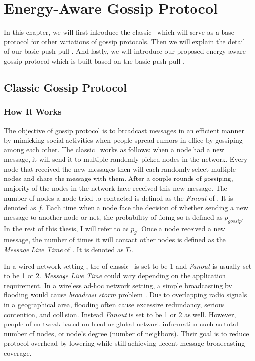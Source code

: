\chapter{Energy-Aware Gossip Protocol}
\label{Chapter3}

In this chapter, we will first introduce the classic \gp ~which will serve as a base protocol for other variations of gossip protocols. Then we will explain the detail of our basic push-pull \gp. And lastly, we will introduce our proposed energy-aware gossip protocol which is built based on the basic push-pull \gp.

\section{Classic Gossip Protocol}
\subsection{How It Works} \label{basic gossip}

The objective of gossip protocol is to broadcast messages in an efficient manner by mimicking social activities when people spread rumors in office by gossiping among each other. The classic \gp ~works as follows: when a node had a new message, it will send it to multiple randomly picked nodes in the network. Every node that received the new messages then will each randomly select multiple nodes and share the message with them. After a couple rounds of gossiping, majority of the nodes in the network have received this new message. The number of nodes a node tried to contacted is defined as the \emph{Fanout} of \gp. It is denoted as $f$. Each time when a node face the decision of whether sending a new message to another node or not, the probability of doing so is defined as $p_{gossip}$. In the rest of this thesis, I will refer to \emph{\pog} as $p_g$. Once a node received a new message, the number of times it will contact other nodes is defined as the \emph{Message Live Time} of \gp. It is denoted as $T_l$.

In a wired network setting , the \emph{\pog} of classic \gp ~is set to be 1 and \emph{Fanout} is usually set to be 1 or 2. \emph{Message Live Time} could vary depending on the application requirement. In a wireless ad-hoc network setting, a simple broadcasting by flooding would cause \emph{broadcast storm} problem \cite{tseng2002broadcast}. Due to overlapping radio signals in a geographical area, flooding often cause excessive redundancy, serious contention, and collision. Instead \emph{Fanout} is set to be 1 or 2 as well. However, people often tweak \emph{\pog} based on local or global network information such as total number of nodes, or node's degree (number of neighbors). Their goal is to reduce protocol overhead by lowering \emph{\pog} while still achieving decent message broadcasting coverage. 

